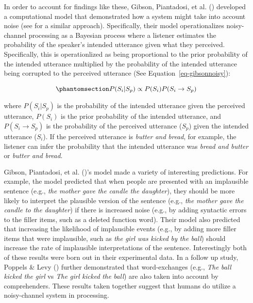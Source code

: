 \documentclass[
  12pt,
  letterpaper,
]{scrreport}
\begin{document}
In order to account for findings like these, Gibson, Piantadosi, et al.
()
developed a computational model that demonstrated how a system might
take into account noise (see
 for a similar
approach). Specifically, their model operationalizes noisy-channel
processing as a Bayesian process where a listener estimates the
probability of the speaker's intended utterance given what they
perceived. Specifically, this is operationlized as being proportional to
the prior probability of the intended utterance multiplied by the
probability of the intended utterance being corrupted to the perceived
utterance (See Equation~\ref{eq-gibsonnoisy}):

\begin{equation}\phantomsection\label{eq-gibsonnoisy}{
P(S_i|S_p) \propto P(S_i) P(S_i \to S_p)
}\end{equation}

\noindent where \(P(S_i|S_p)\) is the probability of the intended
utterance given the perceived utterance, \(P(S_i)\) is the prior
probability of the intended utterance, and \(P(S_i \to S_p)\) is the
probability of the perceived utterance (\(S_p\)) given the intended
utterance (\(S_i\)). If the perceived utterance is
\emph{butter and bread}, for example, the listener can infer the
probability that the intended utterance was \emph{bread and butter} or
\emph{butter and bread}.

Gibson, Piantadosi, et al.
()'s
model made a variety of interesting predictions. For example, the model
predicted that when people are presented with an implausible sentence
(e.g., \emph{the mother gave the candle the daughter}), they should be
more likely to interpret the plausible version of the sentence (e.g.,
\emph{the mother gave the candle to the
daughter}) if there is increased noise (e.g., by adding syntactic errors
to the filler items, such as a deleted function word). Their model also
predicted that increasing the likelihood of implausible events (e.g., by
adding more filler items that were implausible, such as
\emph{the girl was kicked by the ball}) should increase the rate of
implausible interpretations of the sentence. Interestingly both of these
results were born out in their experimental data. In a follow up study,
Poppels \& Levy
()
further demonstrated that word-exchanges (e.g., \emph{The
ball kicked the girl} vs \emph{The girl kicked the ball}) are also taken
into account by comprehenders. These results taken together suggest that
humans do utilize a noisy-channel system in processing.
\end{document}
